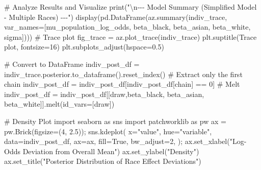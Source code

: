 \documentclass[
]{agujournal2019}
\newenvironment{Shaded}{\begin{snugshade}}{\end{snugshade}}
\newcommand{\BuiltInTok}[1]{\textcolor[rgb]{0.00,0.23,0.31}{#1}}
\newcommand{\CharTok}[1]{\textcolor[rgb]{0.13,0.47,0.30}{#1}}
\newcommand{\CommentTok}[1]{\textcolor[rgb]{0.37,0.37,0.37}{#1}}
\newcommand{\DecValTok}[1]{\textcolor[rgb]{0.68,0.00,0.00}{#1}}
\newcommand{\FloatTok}[1]{\textcolor[rgb]{0.68,0.00,0.00}{#1}}
\newcommand{\ImportTok}[1]{\textcolor[rgb]{0.00,0.46,0.62}{#1}}
\newcommand{\NormalTok}[1]{\textcolor[rgb]{0.00,0.23,0.31}{#1}}
\newcommand{\OperatorTok}[1]{\textcolor[rgb]{0.37,0.37,0.37}{#1}}
\newcommand{\StringTok}[1]{\textcolor[rgb]{0.13,0.47,0.30}{#1}}
\newcommand{\VariableTok}[1]{\textcolor[rgb]{0.07,0.07,0.07}{#1}}
\begin{document}
\begin{Shaded}
\begin{Highlighting}[]
\CommentTok{\# Analyze Results and Visualize}
\BuiltInTok{print}\NormalTok{(}\StringTok{"}\CharTok{\textbackslash{}n}\StringTok{{-}{-}{-} Model Summary (Simplified Model {-} Multiple Races) {-}{-}{-}"}\NormalTok{)}
\NormalTok{display(pd.DataFrame(az.summary(indiv\_trace, var\_names}\OperatorTok{=}\NormalTok{[}\StringTok{\textquotesingle{}mu\_population\_log\_odds\textquotesingle{}}\NormalTok{, }\StringTok{\textquotesingle{}beta\_black\textquotesingle{}}\NormalTok{, }\StringTok{\textquotesingle{}beta\_asian\textquotesingle{}}\NormalTok{, }\StringTok{\textquotesingle{}beta\_white\textquotesingle{}}\NormalTok{, }\StringTok{\textquotesingle{}sigma\textquotesingle{}}\NormalTok{])))}
\CommentTok{\# Trace plot}
\NormalTok{fig\_trace }\OperatorTok{=}\NormalTok{ az.plot\_trace(indiv\_trace)}
\NormalTok{plt.suptitle(}\StringTok{\textquotesingle{}Trace plot\textquotesingle{}}\NormalTok{, fontsize}\OperatorTok{=}\DecValTok{16}\NormalTok{)}
\NormalTok{plt.subplots\_adjust(hspace}\OperatorTok{=}\FloatTok{0.5}\NormalTok{) }

\CommentTok{\# Convert to DataFrame}
\NormalTok{indiv\_post\_df }\OperatorTok{=}\NormalTok{ indiv\_trace.posterior.to\_dataframe().reset\_index()}
\CommentTok{\# Extract only the first chain}
\NormalTok{indiv\_post\_df }\OperatorTok{=}\NormalTok{ indiv\_post\_df[indiv\_post\_df[}\StringTok{\textquotesingle{}chain\textquotesingle{}}\NormalTok{] }\OperatorTok{==} \DecValTok{0}\NormalTok{]}
\CommentTok{\# Melt}
\NormalTok{indiv\_post\_df }\OperatorTok{=}\NormalTok{ indiv\_post\_df[[}\StringTok{\textquotesingle{}draw\textquotesingle{}}\NormalTok{,}\StringTok{\textquotesingle{}beta\_black\textquotesingle{}}\NormalTok{, }\StringTok{\textquotesingle{}beta\_asian\textquotesingle{}}\NormalTok{, }\StringTok{\textquotesingle{}beta\_white\textquotesingle{}}\NormalTok{]].melt(id\_vars}\OperatorTok{=}\NormalTok{[}\StringTok{\textquotesingle{}draw\textquotesingle{}}\NormalTok{])}

\CommentTok{\# Density Plot}
\ImportTok{import}\NormalTok{ seaborn }\ImportTok{as}\NormalTok{ sns}
\ImportTok{import}\NormalTok{ patchworklib }\ImportTok{as}\NormalTok{ pw}
\NormalTok{ax }\OperatorTok{=}\NormalTok{ pw.Brick(figsize}\OperatorTok{=}\NormalTok{(}\DecValTok{4}\NormalTok{, }\FloatTok{2.5}\NormalTok{))}\OperatorTok{;}
\NormalTok{sns.kdeplot(}
\NormalTok{    x}\OperatorTok{=}\StringTok{"value"}\NormalTok{, hue}\OperatorTok{=}\StringTok{"variable"}\NormalTok{, data}\OperatorTok{=}\NormalTok{indiv\_post\_df, ax}\OperatorTok{=}\NormalTok{ax,}
\NormalTok{    fill}\OperatorTok{=}\VariableTok{True}\NormalTok{, bw\_adjust}\OperatorTok{=}\DecValTok{2}\NormalTok{,}
\NormalTok{)}\OperatorTok{;}
\NormalTok{ax.set\_xlabel(}\StringTok{"Log{-}Odds Deviation from Overall Mean"}\NormalTok{)}
\NormalTok{ax.set\_ylabel(}\StringTok{"Density"}\NormalTok{)}
\NormalTok{ax.set\_title(}\StringTok{"Posterior Distribution of Race Effect Deviations"}\NormalTok{)}
\end{Highlighting}
\end{Shaded}
\end{document}
